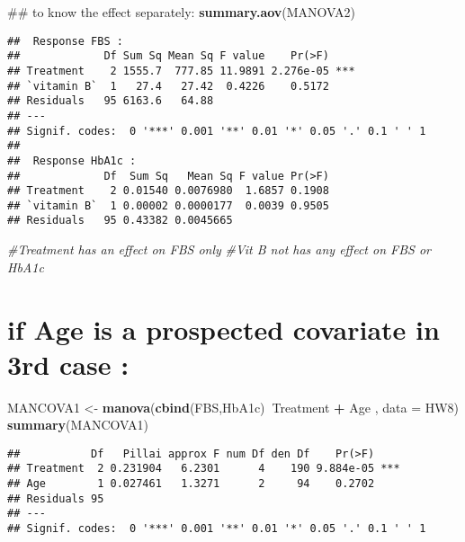 \documentclass[]{article}
\newenvironment{Shaded}{\begin{snugshade}}{\end{snugshade}}
\newcommand{\KeywordTok}[1]{\textcolor[rgb]{0.13,0.29,0.53}{\textbf{#1}}}
\newcommand{\DataTypeTok}[1]{\textcolor[rgb]{0.13,0.29,0.53}{#1}}
\newcommand{\StringTok}[1]{\textcolor[rgb]{0.31,0.60,0.02}{#1}}
\newcommand{\CommentTok}[1]{\textcolor[rgb]{0.56,0.35,0.01}{\textit{#1}}}
\newcommand{\OperatorTok}[1]{\textcolor[rgb]{0.81,0.36,0.00}{\textbf{#1}}}
\newcommand{\NormalTok}[1]{#1}
\begin{document}
\begin{Shaded}
\begin{Highlighting}[]
\NormalTok{## to know the effect separately:}
\KeywordTok{summary.aov}\NormalTok{(MANOVA2)}
\end{Highlighting}
\end{Shaded}

\begin{verbatim}
##  Response FBS :
##             Df Sum Sq Mean Sq F value    Pr(>F)    
## Treatment    2 1555.7  777.85 11.9891 2.276e-05 ***
## `vitamin B`  1   27.4   27.42  0.4226    0.5172    
## Residuals   95 6163.6   64.88                      
## ---
## Signif. codes:  0 '***' 0.001 '**' 0.01 '*' 0.05 '.' 0.1 ' ' 1
## 
##  Response HbA1c :
##             Df  Sum Sq   Mean Sq F value Pr(>F)
## Treatment    2 0.01540 0.0076980  1.6857 0.1908
## `vitamin B`  1 0.00002 0.0000177  0.0039 0.9505
## Residuals   95 0.43382 0.0045665
\end{verbatim}

\begin{Shaded}
\begin{Highlighting}[]
\CommentTok{#Treatment has an effect on FBS only  }
\CommentTok{#Vit B not has any effect on FBS or HbA1c}
\end{Highlighting}
\end{Shaded}

\section{if Age is a prospected covariate in 3rd case
:}\label{if-age-is-a-prospected-covariate-in-3rd-case}

\begin{Shaded}
\begin{Highlighting}[]
\NormalTok{MANCOVA1 <-}\StringTok{ }\KeywordTok{manova}\NormalTok{(}\KeywordTok{cbind}\NormalTok{(FBS,HbA1c)}\OperatorTok{~}\NormalTok{Treatment }\OperatorTok{+}\StringTok{ }\NormalTok{Age , }\DataTypeTok{data =}\NormalTok{ HW8)}
\KeywordTok{summary}\NormalTok{(MANCOVA1)}
\end{Highlighting}
\end{Shaded}

\begin{verbatim}
##           Df   Pillai approx F num Df den Df    Pr(>F)    
## Treatment  2 0.231904   6.2301      4    190 9.884e-05 ***
## Age        1 0.027461   1.3271      2     94    0.2702    
## Residuals 95                                              
## ---
## Signif. codes:  0 '***' 0.001 '**' 0.01 '*' 0.05 '.' 0.1 ' ' 1
\end{verbatim}
\end{document}
